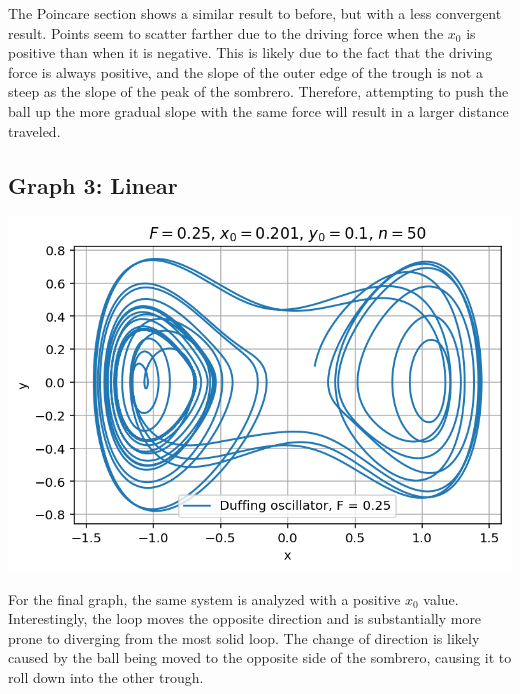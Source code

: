 \documentclass[aps,pra,notitlepage,amsmath,amssymb,letterpaper,12pt]{revtex4-1}
\begin{document}
The Poincare section shows a similar result to before, but with a less convergent result.  Points seem to scatter farther due to the driving force when the $x_0$ is positive than when it is negative.  This is likely due to the fact that the driving force is always positive, and the slope of the outer edge of the trough is not a steep as the slope of the peak of the sombrero.  Therefore, attempting to push the ball up the more gradual slope with the same force will result in a larger distance traveled.

\subsection{Graph 3: Linear}

\includegraphics{graph3.png}

For the final graph, the same system is analyzed with a positive $x_0$ value.  Interestingly, the loop moves the opposite direction and is substantially more prone to diverging from the most solid loop.  The change of direction is likely caused by the ball being moved to the opposite side of the sombrero, causing it to roll down into the other trough.
\end{document}
